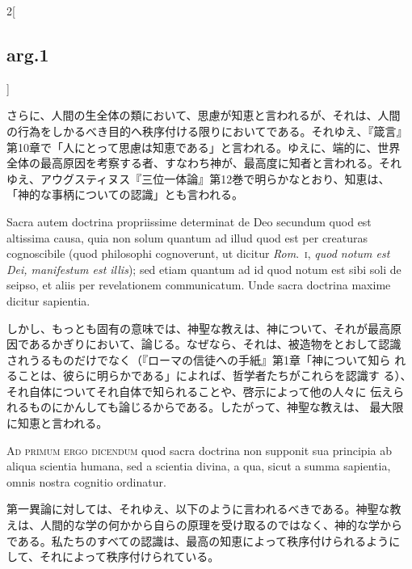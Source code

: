 \documentclass[
paper=a4paper,
fontsize=10pt,
jafontsize=9pt,
titlepage
]{jlreq}
\begin{document}
\begin{paracol}{2}[\subsection{arg.1}]
\switchcolumn

さらに、人間の生全体の類において、思慮が知恵と言われるが、それは、人間
の行為をしかるべき目的へ秩序付ける限りにおいてである。それゆえ、『箴言』
第10章で「人にとって思慮は知恵である」と言われる。ゆえに、端的に、世界
全体の最高原因を考察する者、すなわち神が、最高度に知者と言われる。それ
ゆえ、アウグスティヌス『三位一体論』第12巻で明らかなとおり、知恵は、
「神的な事柄についての認識」とも言われる。

\switchcolumn*

Sacra autem doctrina propriissime determinat de Deo secundum quod est
altissima causa, quia non solum quantum ad illud quod est per
creaturas cognoscibile (quod philosophi cognoverunt, ut dicitur
{\itshape Rom}.~{\scshape i}, {\itshape quod notum est Dei, manifestum
est illis}); sed etiam quantum ad id quod notum est sibi soli de
seipso, et aliis per revelationem communicatum. Unde sacra doctrina
maxime dicitur sapientia.

\switchcolumn

しかし、もっとも固有の意味では、神聖な教えは、神について、それが最高原
因であるかぎりにおいて、論じる。なぜなら、それは、被造物をとおして認識
されうるものだけでなく（『ローマの信徒への手紙』第1章「神について知ら
れることは、彼らに明らかである」によれば、哲学者たちがこれらを認識す
る）、それ自体についてそれ自体で知られることや、啓示によって他の人々に
伝えられるものにかんしても論じるからである。したがって、神聖な教えは、
最大限に知恵と言われる。

\switchcolumn*[\subsection{ad.1}]

{\scshape Ad primum ergo dicendum} quod sacra doctrina non supponit
sua principia ab aliqua scientia humana, sed a scientia divina, a qua,
sicut a summa sapientia, omnis nostra cognitio ordinatur.

\switchcolumn

第一異論に対しては、それゆえ、以下のように言われるべきである。神聖な教
えは、人間的な学の何かから自らの原理を受け取るのではなく、神的な学から
である。私たちのすべての認識は、最高の知恵によって秩序付けられるように
して、それによって秩序付けられている。

\switchcolumn*[\subsection{ad.2}]


\end{paracol}
\end{document}
